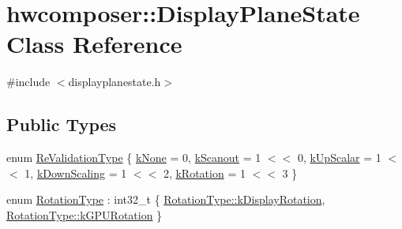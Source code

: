 \hypertarget{classhwcomposer_1_1DisplayPlaneState}{}\section{hwcomposer\+:\+:Display\+Plane\+State Class Reference}
\label{classhwcomposer_1_1DisplayPlaneState}


{\ttfamily \#include $<$displayplanestate.\+h$>$}

\subsection*{Public Types}
\begin{DoxyCompactItemize}
\item 
enum \mbox{\hyperlink{classhwcomposer_1_1DisplayPlaneState_ad2e0ccaa6d76d538d9338563c91db589}{Re\+Validation\+Type}} \{ \newline
\mbox{\hyperlink{classhwcomposer_1_1DisplayPlaneState_ad2e0ccaa6d76d538d9338563c91db589aeade1efaa3a8e110807cd742c00c73c3}{k\+None}} = 0, 
\mbox{\hyperlink{classhwcomposer_1_1DisplayPlaneState_ad2e0ccaa6d76d538d9338563c91db589aedc800f15466d51911516344e13b0a2d}{k\+Scanout}} = 1 $<$$<$ 0, 
\mbox{\hyperlink{classhwcomposer_1_1DisplayPlaneState_ad2e0ccaa6d76d538d9338563c91db589a0f91100752f5d2f143b10222f264c133}{k\+Up\+Scalar}} = 1 $<$$<$ 1, 
\mbox{\hyperlink{classhwcomposer_1_1DisplayPlaneState_ad2e0ccaa6d76d538d9338563c91db589a9295f4ad53b9f22fe8b976dd4afd84e0}{k\+Down\+Scaling}} = 1 $<$$<$ 2, 
\newline
\mbox{\hyperlink{classhwcomposer_1_1DisplayPlaneState_ad2e0ccaa6d76d538d9338563c91db589a7d1a994f2b7c02f18851dca8471a1450}{k\+Rotation}} = 1 $<$$<$ 3
 \}
\item 
enum \mbox{\hyperlink{classhwcomposer_1_1DisplayPlaneState_a907c53d6739ccbfb5058a0f34f3de657}{Rotation\+Type}} \+: int32\+\_\+t \{ \mbox{\hyperlink{classhwcomposer_1_1DisplayPlaneState_a907c53d6739ccbfb5058a0f34f3de657a91c319c8bcf2c5686169929c170c8d2e}{Rotation\+Type\+::k\+Display\+Rotation}}, 
\mbox{\hyperlink{classhwcomposer_1_1DisplayPlaneState_a907c53d6739ccbfb5058a0f34f3de657a5b98db46be3ebb427a634f7a07033357}{Rotation\+Type\+::k\+G\+P\+U\+Rotation}}
 \}
\end{DoxyCompactItemize}

